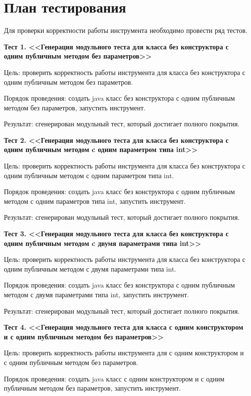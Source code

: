 \section{План тестирования} \label{sub26}

Для проверки корректности работы инструмента необходимо провести ряд тестов.

\textbf{Тест 1. <<Генерация модульного теста для класса без конструктора с одним публичным методом без параметров>>}

Цель: проверить корректность работы инструмента  для класса без конструктора с одним публичным методом без параметров.

Порядок проведения: создать java класс без конструктора с одним публичным методом без параметров, запустить инструмент.

Результат: сгенерирован модульный тест, который достигает полного покрытия.


\textbf{Тест 2. <<Генерация модульного теста для класса без конструктора с одним публичным методом c одним параметром типа int>>}

Цель: проверить корректность работы инструмента  для класса без конструктора с одним публичным методом с одним параметром типа int.

Порядок проведения: создать java класс без конструктора с одним публичным методом с одним параметров типа int, запустить инструмент.

Результат: сгенерирован модульный тест, который достигает полного покрытия.


\textbf{Тест 3. <<Генерация модульного теста для класса без конструктора с одним публичным методом c двумя параметрами типа int>>}

Цель: проверить корректность работы инструмента  для класса без конструктора с одним публичным методом с двумя параметрами типа int.

Порядок проведения: создать java класс без конструктора с одним публичным методом с двумя параметрами типа int, запустить инструмент.

Результат: сгенерирован модульный тест, который достигает полного покрытия.

\textbf{Тест 4. <<Генерация модульного теста для класса с одним конструктором и с одним публичным методом без параметров>>}

Цель: проверить корректность работы инструмента для с одним конструктором и с одним публичным методом без параметров.

Порядок проведения: создать java класс с одним конструктором и с одним публичным методом без параметров, запустить инструмент.


